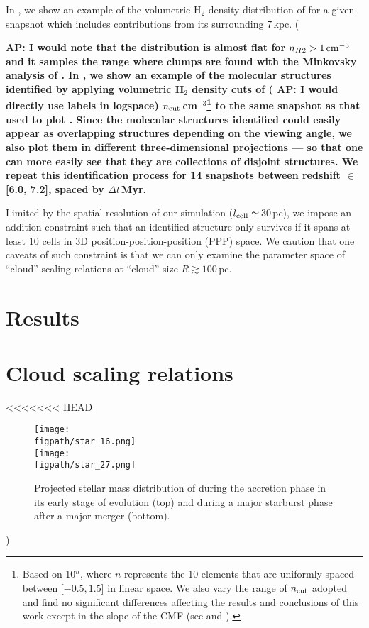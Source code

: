 \documentclass[apj]{emulateapj} %
\newcommand{\AP}[1]{({\bf \color{apcolor} AP: #1})}
\begin{document}
In , we show an example of the volumetric H$_2$ density distribution of \flower
for a given snapshot which includes contributions from its surrounding 7\,kpc.
\AP{I would note that the distribution is almost flat for $n_{H2}>1\,{\rm cm}^{-3}$ and it samples the range where clumps are found with the Minkovsky analysis of \citet{Pallottini17b}.
In \Fig{MC}, we show an example of the molecular structures identified by applying volumetric H$_2$ density cuts of \AP{I would directly use labels in logspace} $n_{\rm cut}$\eq[0.32, 0.53, 0.88, 1.45, 2.45, 4.08, 6.81, 11.36, 19.00, 31.62]\,cm$^{-3}$\footnote{Based on 10$^n$, where $n$ represents the 10 elements that are uniformly spaced between [$-0.5, 1.5$] in linear space.
We also vary the range of
$n_{\rm cut}$ adopted and find no significant differences
affecting the results and conclusions of this work except in the slope of the CMF (see \Sec{ncut} and \Sec{cmf}).}
to the same snapshot as that
used to plot \Fig{h2density}.
Since the molecular structures identified could
easily appear as overlapping structures depending on the viewing angle, we
also plot them in different three-dimensional projections --- so that one can more
easily see that they are collections of disjoint structures.
We repeat this identification process for 14 snapshots between
redshift \z$\in$[6.0, 7.2], spaced by $\Delta t$\eq50\,Myr.


Limited by the spatial resolution of our simulation ($l_{\rm cell}\simeq$\,30\,pc), we impose an addition constraint such that an identified structure only survives if it spans at least 10 cells in 3D position-position-position (PPP) space. We caution that one caveats of such constraint is that we can only examine the parameter space of ``cloud'' scaling relations at ``cloud'' size $R\gtrsim100$\,pc.


\section{Results}     \label{sec:results}
\section{Cloud scaling relations} \label{sec:results}

<<<<<<< HEAD
\begin{figure}[htbp]
\centering
\texttt{[image: \\figpath/star\_16.png]}
\\ [-5em]
\texttt{[image: \\figpath/star\_27.png]}
\caption{
Projected stellar mass distribution of \flower during the accretion phase
in its early stage of evolution (top) and during a major starburst phase
after a major merger (bottom).
\label{fig:phases}}
\end{figure}


}
\end{document}
